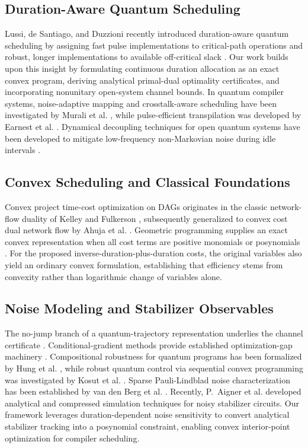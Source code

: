 \documentclass[10pt,letterpaper,journal]{IEEEtran}
\begin{document}
\subsection{Duration-Aware Quantum Scheduling}
Lussi, de Santiago, and Duzzioni recently introduced duration-aware quantum scheduling by assigning fast pulse implementations to critical-path operations and robust, longer implementations to available off-critical slack \cite{lussi}. Our work builds upon this insight by formulating continuous duration allocation as an exact convex program, deriving analytical primal-dual optimality certificates, and incorporating nonunitary open-system channel bounds. In quantum compiler systems, noise-adaptive mapping and crosstalk-aware scheduling have been investigated by Murali et al. \cite{murali_noise,murali_crosstalk}, while pulse-efficient transpilation was developed by Earnest et al. \cite{earnest}. Dynamical decoupling techniques for open quantum systems have been developed to mitigate low-frequency non-Markovian noise during idle intervals \cite{viola_dd,qiskit_sched}.

\subsection{Convex Scheduling and Classical Foundations}
Convex project time-cost optimization on DAGs originates in the classic network-flow duality of Kelley \cite{kelley} and Fulkerson \cite{fulkerson}, subsequently generalized to convex cost dual network flow by Ahuja et al. \cite{ahuja}. Geometric programming supplies an exact convex representation when all cost terms are positive monomials or posynomials \cite{boydgp}. For the proposed inverse-duration-plus-duration costs, the original variables also yield an ordinary convex formulation, establishing that efficiency stems from convexity rather than logarithmic change of variables alone.

\subsection{Noise Modeling and Stabilizer Observables}
The no-jump branch of a quantum-trajectory representation underlies the channel certificate \cite{dalibard}. Conditional-gradient methods provide established optimization-gap machinery \cite{jaggi}. Compositional robustness for quantum programs has been formalized by Hung et al. \cite{hung}, while robust quantum control via sequential convex programming was investigated by Kosut et al. \cite{kosut}. Sparse Pauli-Lindblad noise characterization has been established by van den Berg et al. \cite{vandenberg}. Recently, P.~Aigner et al. \cite{aigner} developed analytical and compressed simulation techniques for noisy stabilizer circuits. Our framework leverages duration-dependent noise sensitivity to convert analytical stabilizer tracking into a posynomial constraint, enabling convex interior-point optimization for compiler scheduling.
\end{document}
